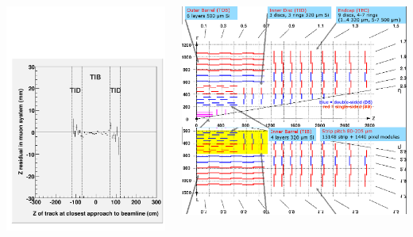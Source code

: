 \documentclass[compress]{beamer}
\begin{document}
\begin{frame}
\begin{columns}
\includegraphics[width=\linewidth]{zresid_from_tracker_innerbottom.pdf}

\includegraphics[width=\linewidth]{tracker_map_innerbottom.png}


\end{columns}
\end{frame}
\end{document}
